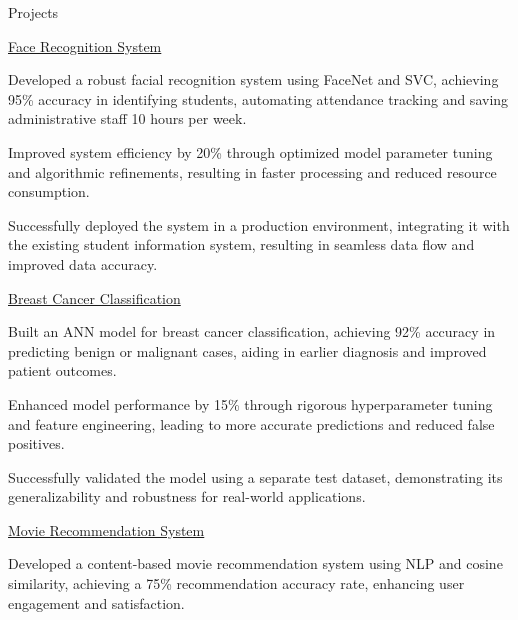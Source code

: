 \documentclass{resume} %
\begin{document}
    \begin{rSection}{Projects}
                    \begin{rSubsection}
                                    {\href{Github Link}{Face Recognition System}}
                                {}{}{}
                                    \item Developed a robust facial recognition system using FaceNet and SVC, achieving 95\% accuracy in identifying students, automating attendance tracking and saving administrative staff 10 hours per week.
                                    \item Improved system efficiency by 20\% through optimized model parameter tuning and algorithmic refinements, resulting in faster processing and reduced resource consumption.
                                    \item Successfully deployed the system in a production environment, integrating it with the existing student information system, resulting in seamless data flow and improved data accuracy.
                            \end{rSubsection}
                    \begin{rSubsection}
                                    {\href{Github Link}{Breast Cancer Classification}}
                                {}{}{}
                                    \item Built an ANN model for breast cancer classification, achieving 92\% accuracy in predicting benign or malignant cases, aiding in earlier diagnosis and improved patient outcomes.
                                    \item Enhanced model performance by 15\% through rigorous hyperparameter tuning and feature engineering, leading to more accurate predictions and reduced false positives.
                                    \item Successfully validated the model using a separate test dataset, demonstrating its generalizability and robustness for real-world applications.
                            \end{rSubsection}
                    \begin{rSubsection}
                                    {\href{Github Link}{Movie Recommendation System}}
                                {}{}{}
                                    \item Developed a content-based movie recommendation system using NLP and cosine similarity, achieving a 75\% recommendation accuracy rate, enhancing user engagement and satisfaction.

\end{rSubsection}
\end{rSection}
\end{document}
